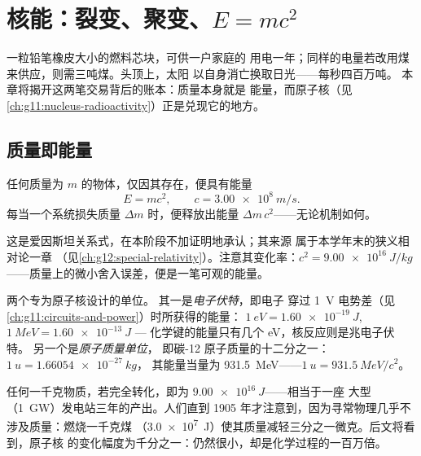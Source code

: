 \chapter{核能：裂变、聚变、$E=mc^2$}\label{ch:g12:nuclear-energy}

一粒铅笔橡皮大小的燃料芯块，可供一户家庭的
用电一年；同样的电量若改用煤来供应，则需三吨煤。头顶上，太阳
以自身消亡换取日光——每秒四百万吨。
本章将揭开这两笔交易背后的账本：质量本身就是
能量，而原子核（见\cref{ch:g11:nucleus-radioactivity}）正是兑现它的地方。

\section{质量即能量}

\begin{theorem}[质能等价]\label{thm:g12:nuclear-energy:emc2}
任何质量为 $m$ 的物体，仅因其存在，便具有能量
\[
E = m c^2, \qquad c = \qty{3.00e8}{m/s}.
\]
每当一个系统损失质量 $\Delta m$ 时，便释放出能量
$\Delta m\, c^2$——无论机制如何。
\end{theorem}
\admitted

\begin{remark}[爱因斯坦，1905]\label{rem:g12:nuclear-energy:einstein}
这是爱因斯坦关系式，在本阶段不加证明地承认；其来源
属于本学年末的狭义相对论一章
（见\cref{ch:g12:special-relativity}）。注意其变化率：$c^2 = \qty{9.00e16}{J/kg}$
——质量上的微小舍入误差，便是一笔可观的能量。
\end{remark}

\begin{definition}[电子伏特与原子质量单位]\label{def:g12:nuclear-energy:units}
两个专为原子核设计的单位。
其一是\emph{电子伏特}，即电子
穿过 \qty{1}{V} 电势差（见\cref{ch:g11:circuits-and-power}）时所获得的能量：
$\qty{1}{eV} = \qty{1.60e-19}{J}$, $\qty{1}{MeV} = \qty{1.60e-13}{J}$ ---
化学键的能量只有几个 \unit{eV}，核反应则是兆电子伏特。
另一个是\emph{原子质量单位}，
即碳-12 原子质量的十二分之一：$\qty{1}{u} = \qty{1.66054e-27}{kg}$，
其能量当量为 \qty{931.5}{MeV}——$\qty{1}{u} = \qty{931.5}{MeV}/c^2$。
\end{definition}

\begin{example}[沉睡的财富]\label{ex:g12:nuclear-energy:fortune}
任何一千克物质，若完全转化，即为 $\qty{9.00e16}{J}$——相当于一座
大型（\qty{1}{GW}）发电站三年的产出。人们直到
1905 年才注意到，因为寻常物理几乎不涉及质量：燃烧一千克煤
（\qty{3.0e7}{J}）使其质量减轻三分之一微克。后文将看到，原子核
的变化幅度为千分之一：仍然很小，却是化学过程的一百万倍。
\end{example}

